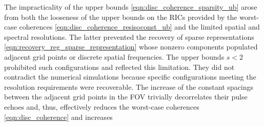 The impracticality of
the upper bounds
\eqref{eqn:disc_coherence_sparsity_ub} arose from both
the looseness of
the upper bounds on
the \acp{RIC} provided by
the worst-case coherences
\eqref{eqn:disc_coherence_resisoconst_ub} and
the limited spatial and
spectral resolutions.
The latter prevented
the recovery of
sparse representations
\eqref{eqn:recovery_reg_sparse_representation} whose
nonzero components populated
adjacent grid points or
discrete spatial frequencies.
The upper bounds $s < 2$ prohibited
such configurations and reflected
this limitation.
They did not contradict
the numerical simulations because
specific configurations meeting
the resolution requirements were
recoverable.
The increase of
the constant spacings between
the adjacent grid points in
the \ac{FOV} trivially decorrelates
their pulse echoes and, thus, effectively reduces
the worst-case coherences
\eqref{eqn:disc_coherence} and increases
